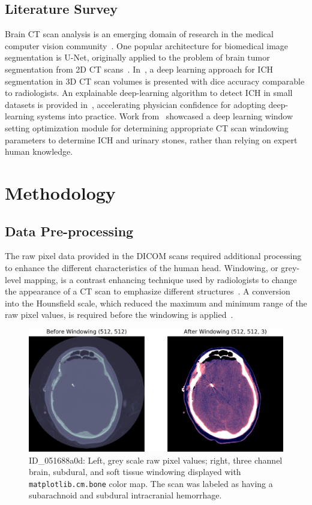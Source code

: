 \documentclass[runningheads]{llncs}
\begin{document}
\subsection{Literature Survey}
Brain CT scan analysis is an emerging domain of research in the medical computer vision community~\cite{10.1007/978-3-319-24574-4_28,10.1007/978-3-030-11723-8_46,10.1038/s41551-018-0324-9,lee2018practical}.
One popular architecture for biomedical image segmentation is U-Net, originally applied to the problem of brain tumor segmentation from 2D CT scans~\cite{10.1007/978-3-319-24574-4_28}.
In~\cite{10.1007/978-3-030-11723-8_46}, a deep learning approach for ICH segmentation in 3D CT scan volumes is presented with dice accuracy comparable to radiologists.
An explainable deep-learning algorithm to detect ICH in small datasets is provided in~\cite{10.1038/s41551-018-0324-9}, accelerating physician confidence for adopting deep-learning systems into practice.
Work from~\cite{lee2018practical} showcased a deep learning window setting optimization module for determining appropriate CT scan windowing parameters to determine ICH and urinary stones, rather than relying on expert human knowledge.

\section{Methodology}

\subsection{Data Pre-processing}

The raw pixel data provided in the DICOM scans required additional processing to enhance the different characteristics of the human head.
Windowing, or grey-level mapping, is a contrast enhancing technique used by radiologists to change the appearance of a CT scan to emphasize different structures~\cite{TIDWELL199965}.
A conversion into the Hounsfield scale, which reduced the maximum and minimum range of the raw pixel values, is required before the windowing is applied~\cite{DEVOS2009609}.

\begin{figure}[htbp]
    \centering
    \includegraphics[width=4.8in]{fig/dicom_window}
    \caption{ID\_051688a0d: Left, grey scale raw pixel values; right, three channel brain, subdural, and soft tissue windowing displayed with \texttt{matplotlib.cm.bone} color map. The scan was labeled as having a subarachnoid and subdural intracranial hemorrhage.}
    \label{fig:dicom_windowing}
\end{figure}
\end{document}
